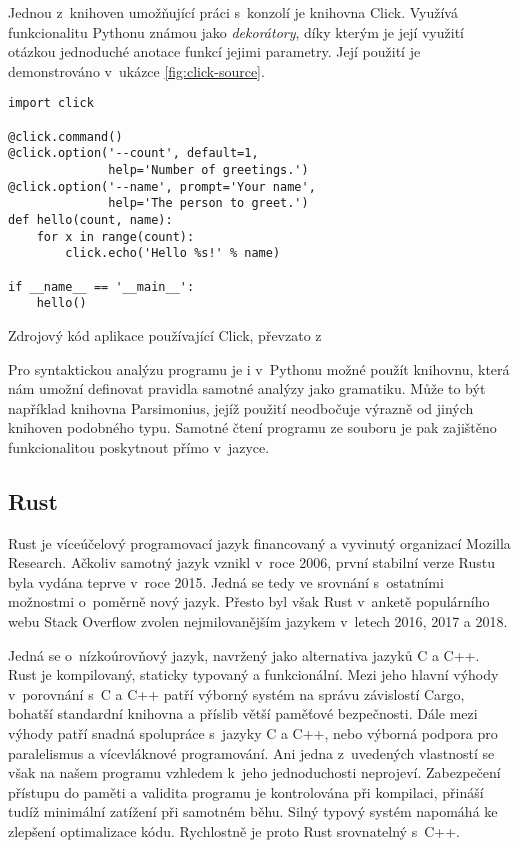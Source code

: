 Jednou z~knihoven umožňující práci s~konzolí je knihovna Click\cite{website-click}. Využívá funkcionalitu Pythonu známou jako \textit{dekorátory}, díky kterým je její využití otázkou jednoduché anotace funkcí jejimi parametry. Její použití je demonstrováno v~ukázce \ref{fig:click-source}.

\begin{listing}[htbp]
\begin{verbatim}
import click

@click.command()
@click.option('--count', default=1,
              help='Number of greetings.')
@click.option('--name', prompt='Your name',
              help='The person to greet.')
def hello(count, name):
    for x in range(count):
        click.echo('Hello %s!' % name)

if __name__ == '__main__':
    hello()
\end{verbatim}
\caption{Zdrojový kód aplikace používající Click, převzato z~\cite{website-click}}
\label{fig:click-source}
\end{listing}

Pro syntaktickou analýzu programu je i v~Pythonu možné použít knihovnu, která nám umožní definovat pravidla samotné analýzy jako gramatiku. Může to být například knihovna Parsimonius\cite{github-parsimonious}, jejíž použití neodbočuje výrazně od jiných knihoven podobného typu. Samotné čtení programu ze souboru je pak zajištěno funkcionalitou poskytnout přímo v~jazyce.

\subsection{Rust}
\label{assembler:rust}

Rust je víceúčelový programovací jazyk financovaný a vyvinutý organizací Mozilla Research\cite{rust-faq}. Ačkoliv samotný jazyk vznikl v~roce 2006\cite{rust-faq}, první stabilní verze Rustu byla vydána teprve v~roce 2015\cite{rust-faq}. Jedná se tedy ve srovnání s~ostatními možnostmi o~poměrně nový jazyk. Přesto byl však Rust v~anketě populárního webu Stack Overflow zvolen nejmilovanějším jazykem v~letech 2016\cite{so-survey-2016}, 2017\cite{so-survey-2017} a 2018\cite{so-survey-2018}.

Jedná se o~nízkoúrovňový jazyk, navržený jako alternativa jazyků C a C++. Rust je kompilovaný, staticky typovaný a funkcionální\cite{rust-faq}. Mezi jeho hlavní výhody v~porovnání s~C a C++ patří výborný systém na správu závislostí Cargo, bohatší standardní knihovna a příslib větší paměťové bez\-peč\-nos\-ti. Dále mezi výhody patří snadná spolupráce s~jazyky C a C++, nebo výborná podpora pro paralelismus a vícevláknové programování. Ani jedna z~uvedených vlastností se však na našem programu vzhledem k~jeho jednoduchosti neprojeví. Zabezpečení přístupu do paměti a validita programu je kontrolována při kompilaci\cite{rust-faq}, přináší tudíž minimální zatížení při samotném běhu. Silný typový systém napomáhá ke zlepšení optimalizace kódu. Rychlostně je proto Rust srovnatelný s~C++\cite{rust-vs-cpp}.

